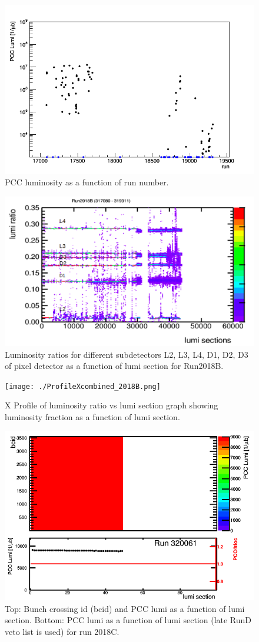 \begin{figure}[H]
  \centering
  \includegraphics[width=0.5\columnwidth]{./runs_2018B.png}
  \caption{PCC luminosity as a function of run number.}
  \label{fig:CMS}
\end{figure}


\begin{figure}[H]
  \centering
  \includegraphics[width=0.5\columnwidth]{./2018B_lumiratio.png}
  \caption{Luminosity ratios for different subdetectors L2, L3, L4, D1, D2, D3 of pixel detector as a function of lumi section for Run2018B.}
  \label{fig:CMS}
\end{figure}



\begin{figure}[H]
  \centering
  \texttt{[image: ./ProfileXcombined\_2018B.png]}
  \caption{X Profile of luminosity ratio vs lumi section graph showing luminosity fraction as a function of lumi section.}
  \label{fig:CMS}
\end{figure}



\begin{figure}[H]
  \centering
  \includegraphics[width=0.5\columnwidth]{./320061.png}
  \caption{Top: Bunch crossing id (bcid) and PCC lumi as a function of lumi section. Bottom: PCC lumi as a function of lumi section (late RunD veto list is used) for run 2018C.}
  \label{fig:CMS}
\end{figure}


